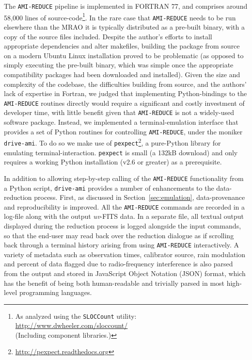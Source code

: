 \documentclass[5p,authoryear]{elsarticle}
\begin{document}
The \texttt{AMI-REDUCE} pipeline is implemented in \mbox{FORTRAN} 77, and comprises around 58,000 lines of 
source-code\footnote{As analyzed using the \texttt{SLOCCount} utility: \\ \url{http://www.dwheeler.com/sloccount/}\\
(Including component libraries.)}. 
In the rare case that \texttt{AMI-REDUCE} needs to be run elsewhere than the MRAO it is typically distributed as a pre-built binary, with a copy of the source files included. 
Despite the author's efforts to install appropriate dependencies and alter makefiles, building the package from source on a modern Ubuntu Linux installation proved to be problematic (as opposed to simply executing the pre-built binary, which was simple once the appropriate compatibility packages had been downloaded and installed). 
Given the size and complexity of the codebase, the difficulties building from source, and the authors' lack of expertise in Fortran, we judged that implementing Python-bindings to the \texttt{AMI-REDUCE} routines directly would require a significant and costly investment of developer time, with little benefit given that \texttt{AMI-REDUCE} is not a widely-used software package. Instead, we implemented a terminal-emulation interface that provides a set of Python routines for controlling \texttt{AMI-REDUCE}, under the moniker \texttt{drive-ami}. 
To do so we make use of 
\texttt{pexpect}\footnote{%
\url{http://pexpect.readthedocs.org}}, 
a pure-Python library for emulating terminal-interaction.  
\texttt{pexpect} is small (a 132kB download) and only requires a working Python installation (v2.6 or greater) as a prerequisite. 

In addition to allowing step-by-step calling of the \texttt{AMI-REDUCE} functionality from a Python script, \texttt{drive-ami} provides a number of enhancements to the data-reduction process.
First, as discussed in Section~\ref{sec:emulation}, data-provenance and reproducibility is improved. 
All the \texttt{AMI-REDUCE} commands are recorded in a log-file along with the output \textit{uv}-FITS data. 
In a separate file, all textual output displayed during the reduction process is logged alongside the input commands, so that the end-user may read back over the reduction dialogue as if scrolling back through a terminal history arising from using \texttt{AMI-REDUCE} interactively. 
A variety of metadata such as observation times, calibrator source, rain modulation and percent of data flagged due to radio-frequency interference is also parsed from the output and stored in JavaScript Object Notation (JSON) format, which has the benefit of being both human-readable and trivially parsed in most high-level programming languages. 
\end{document}
